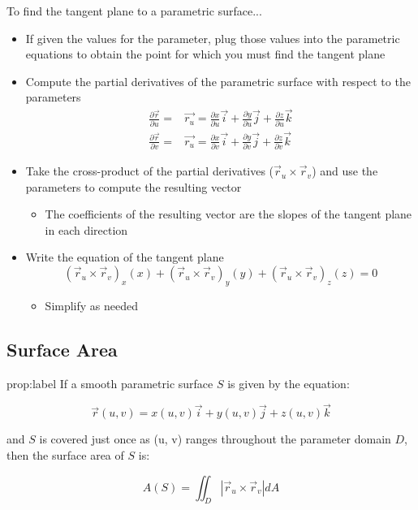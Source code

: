 \documentclass{package/notes}
\begin{document}
To find the tangent plane to a parametric surface...
\begin{itemize}
	\item If given the values for the parameter, plug those values into the parametric equations to obtain the point for which you must find the tangent plane
	\item Compute the partial derivatives of the parametric surface with respect to the parameters
	$$
	\begin{aligned}
		\frac{\partial \vec{r}}{\partial {u}} =& \vec{r_u} = \frac{\partial{x}}{\partial{u}}\vec{i} + \frac{\partial{y}}{\partial{u}}\vec{j} + \frac{\partial{z}}{\partial{u}}\vec{k}\\
		\frac{\partial \vec{r}}{\partial {v}} =& \vec{r_u} = \frac{\partial{x}}{\partial{v}}\vec{i} + \frac{\partial{y}}{\partial{v}}\vec{j} + \frac{\partial{z}}{\partial{v}}\vec{k}
	\end{aligned}
	$$

	\item Take the cross-product of the partial derivatives ($\vec{r}_u \times \vec{r}_v$) and use the parameters to compute the resulting vector
	\begin{itemize}
		\item The coefficients of the resulting vector are the slopes of the tangent plane in each direction
	\end{itemize}
	\item Write the equation of the tangent plane $$(\vec{r}_u\times\vec{r}_v)_x(x)+(\vec{r}_u\times\vec{r}_v)_y(y)+(\vec{r}_u\times\vec{r}_v)_z(z) = 0$$
	\begin{itemize}
		\item Simplify as needed
	\end{itemize}
\end{itemize}


\subsection{Surface Area}

\begin{proposition}{prop:label}
	If a smooth parametric surface $S$ is given by the equation:
	
	$$\vec{r}(u, v)=x(u, v)\vec{i}+y(u,v)\vec{j}+z(u,v)\vec{k}$$
	
	and $S$ is covered just once as (u, v) ranges throughout the parameter domain $D$, then the surface area of $S$ is:
	
	$$A(S) = \iint_D|\vec{r}_u \times \vec{r}_v|dA$$
\end{proposition}
\end{document}
